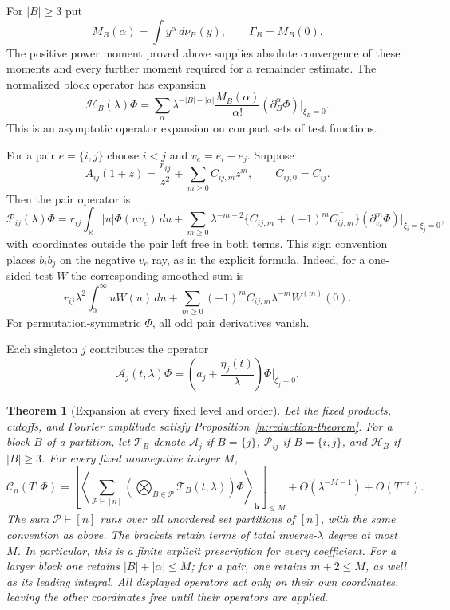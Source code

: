 \documentclass[11pt]{article}
\numberwithin{equation}{section}
\newtheorem{theorem}{Theorem}[section]
\theoremstyle{remark}
\begin{document}
For $|B|\ge3$ put
\[
 M_B(\alpha)=\int y^\alpha\,d\nu_B(y),\qquad
 \Gamma_B=M_B(0).
\]
The positive power moment proved above supplies absolute convergence
of these moments and every further moment required for a remainder estimate.
The normalized block operator has expansion
\[
 \mathcal H_B(\lambda)\Phi
 =\sum_{\alpha}\lambda^{-|B|-|\alpha|}
 \frac{M_B(\alpha)}{\alpha!}
 (\partial_B^\alpha\Phi)|_{\xi_B=0}.
\]
This is an asymptotic operator expansion on compact sets of test functions.

For a pair $e=\{i,j\}$ choose $i<j$ and $v_e=e_i-e_j$. Suppose
\[
 A_{ij}(1+z)=\frac{r_{ij}}{z^2}+\sum_{m\ge0}C_{ij,m}z^m,
 \qquad C_{ij,0}=C_{ij}.
\]
Then the pair operator is
\[
 \mathcal P_{ij}(\lambda)\Phi
 =r_{ij}\int_{\mathbb R}|u|\Phi(uv_e)\,du
 +\sum_{m\ge0}\lambda^{-m-2}
 \{C_{ij,m}+(-1)^m\overline{C_{ij,m}}\}
 (\partial_{v_e}^m\Phi)|_{\xi_i=\xi_j=0},
\]
with coordinates outside the pair left free in both terms. This sign
convention places $b_i\overline{b_j}$ on the negative $v_e$ ray, as in
the explicit formula. Indeed, for a one-sided test $W$ the corresponding
smoothed sum is
\[
 r_{ij}\lambda^2\int_0^\infty uW(u)\,du
 +\sum_{m\ge0}(-1)^m C_{ij,m}\lambda^{-m}W^{(m)}(0).
\]
For permutation-symmetric $\Phi$, all odd pair derivatives vanish.

Each singleton $j$ contributes the operator
\[
 \mathcal A_j(t,\lambda)\Phi
 =\left(a_j+\frac{\eta_j(t)}\lambda\right)\Phi|_{\xi_j=0}.
\]
\begin{theorem}[Expansion at every fixed level and order]
\label{n:all-orders}
Let the fixed products, cutoffs, and Fourier amplitude satisfy
Proposition~\ref{n:reduction-theorem}. For a block $B$ of a partition,
let $\mathcal T_B$ denote $\mathcal A_j$ if $B=\{j\}$,
$\mathcal P_{ij}$ if $B=\{i,j\}$, and $\mathcal H_B$ if $|B|\ge3$.
For every fixed nonnegative integer $M$,
\begin{equation}\label{n:master-expansion}
 \mathcal C_n(T;\Phi)=
 \left[
 \left\langle
 \sum_{\mathcal P\vdash[n]}
     \left(\bigotimes_{B\in\mathcal P}\mathcal T_B(t,\lambda)\right)
                  \Phi
 \right\rangle_{\boldsymbol h}
 \right]_{\le M}
 +O(\lambda^{-M-1})+O(T^{-\varepsilon}).
\end{equation}
The sum $\mathcal P\vdash[n]$ runs over all unordered set
partitions of $[n]$, with the same convention as above.
The brackets retain terms of total inverse-$\lambda$ degree at most
$M$. In particular, this is a finite explicit prescription for every
coefficient. For a larger block one retains $|B|+|\alpha|\le M$;
for a pair, one retains $m+2\le M$, as well as its leading integral.
All displayed operators act only on their own coordinates, leaving the
other coordinates free until their operators are applied.
\end{theorem}
\end{document}
